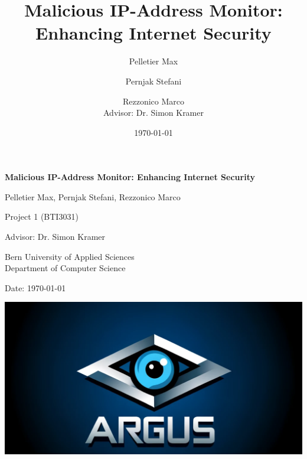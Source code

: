 \documentclass{article}
\title{Malicious IP-Address Monitor: Enhancing Internet Security}
\author{Pelletier Max \and Pernjak Stefani \and Rezzonico Marco \\ Advisor: Dr. Simon Kramer}
\date{\today}
\begin{document}
    \begin{titlepage}
        \vspace{0.1cm}
        \centering
        {\LARGE\bfseries Malicious IP-Address Monitor: Enhancing Internet Security \par}
        \vspace{1cm}
        {\Large Pelletier Max, Pernjak Stefani, Rezzonico Marco \par}
        \vspace{0.5cm}
        {\large Project 1 (BTI3031)\par}
        \vspace{0.5cm}
        {\large Advisor: Dr. Simon Kramer\par}
        \vspace{0.5cm}
        {\large Bern University of Applied Sciences\\Department of Computer Science\par}
        \vspace{0.5cm}
        {\Large Date: \today\par}
        \vspace{3cm}
        \centering
        \includegraphics[width=1\textwidth]{./images/Logo.png}
        \vspace*{\fill}
    \end{titlepage}

\end{document}
